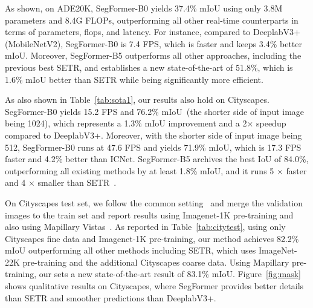 As shown, on ADE20K, SegFormer-B0 yields 37.4\% mIoU using only 3.8M parameters and 8.4G FLOPs, outperforming all other real-time counterparts in terms of parameters, flops, and latency. For instance, compared to DeeplabV3+ (MobileNetV2), SegFormer-B0 is 7.4 FPS, which is faster and keeps 3.4\% better mIoU. Moreover, SegFormer-B5 outperforms all other approaches, including the previous best SETR, and establishes a new state-of-the-art of 51.8\%, which is 1.6\% mIoU better than SETR while being significantly more efficient.

\begin{table}
    \centering
    \vspace{-11.5pt}
	\label{tab:citytest}
    \resizebox{0.99\linewidth}{!}{
	
	\vspace{-11pt}
    }
\end{table}


As also shown in Table~\ref{tab:sota1}, our results also hold on Cityscapes. SegFormer-B0 yields 15.2 FPS and 76.2\% mIoU~(the shorter side of input image being 1024), which represents a 1.3\% mIoU improvement and a 2$\times$ speedup compared to DeeplabV3+. Moreover, with the shorter side of input image being 512, SegFormer-B0 runs at 47.6 FPS and yields 71.9\% mIoU, which is 17.3 FPS faster and 4.2\% better than ICNet. 
SegFormer-B5 archives the best IoU of 84.0\%, outperforming all existing methods by at least 1.8\% mIoU, and it runs 5 $\times$ faster and 4 $\times$ smaller than SETR~\cite{setr}.


On Cityscapes test set, we follow the common setting~\cite{deeplabv3+} and merge the validation images to the train set and report results using Imagenet-1K pre-training and also using Mapillary Vistas~\cite{mv}.
As reported in Table~\ref{tab:citytest},
using only Cityscapes fine data and Imagenet-1K pre-training, our method achieves 82.2\% mIoU outperforming all other methods including SETR, which uses ImageNet-22K pre-training and the additional Cityscapes coarse data. Using Mapillary pre-training, our sets a new state-of-the-art result of 83.1\% mIoU.
Figure~\ref{fig:mask} shows qualitative results on Cityscapes, where SegFormer provides better details than SETR and smoother predictions than DeeplabV3+.



